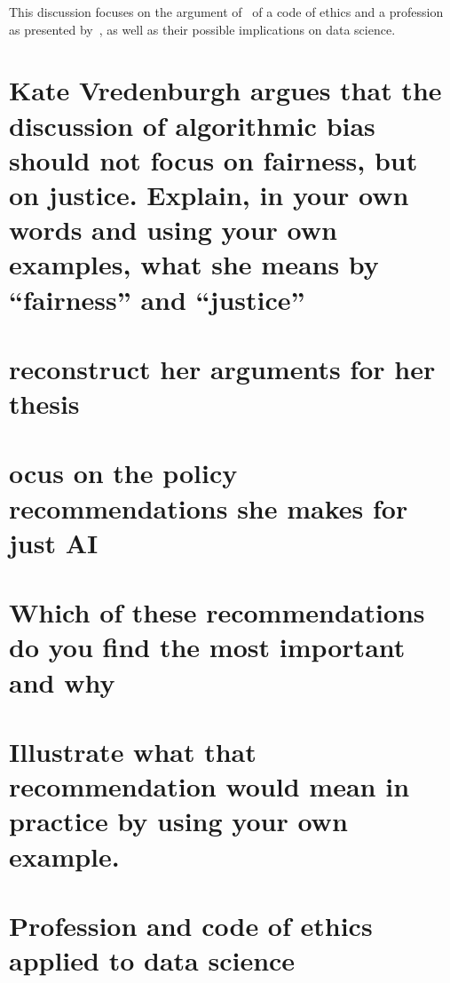 
This discussion focuses on the argument of~\cite{vredenburgh} of a code of ethics and a profession as presented by~\cite{vredenburgh}, as well as their possible implications on data science.

\section*{Kate Vredenburgh argues that the discussion of algorithmic bias should not focus on fairness, but on justice. Explain, in your own words and using your own examples, what she means by “fairness” and “justice”}

\section*{reconstruct her arguments for her thesis}

\section*{ocus on the policy recommendations she makes for just AI}

\section*{Which of these recommendations do you find the most important and why}

\section*{Illustrate what that recommendation would mean in practice by using your own example.}

\section*{Profession and code of ethics applied to data science}

\cite{vredenburgh}